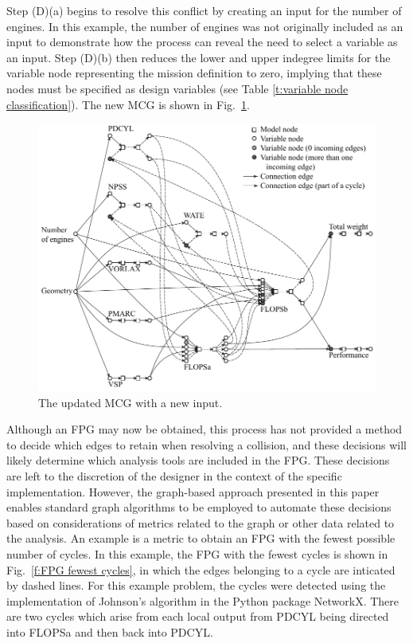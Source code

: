 Step (D)(a) begins to resolve this conflict by creating an input for the number of engines. 
In this example, the number of engines was not originally included as an input to demonstrate how the process can reveal the need to select a variable as an input.
Step (D)(b) then reduces the lower and upper indegree limits for the variable node representing the mission definition to zero, implying that these nodes must be specified as design variables (see Table \ref{t:variable node classification}). 
The new MCG is shown in Fig.~\ref{f:MCG}.
	\begin{figure}[htb!]
	  \begin{center}
		\includegraphics[width=6in]{images/MCG_edit}
	  \end{center}
	  \caption{The updated MCG with a new input.}
	\label{f:MCG}
	\end{figure}

	Although an FPG may now be obtained, this process has not provided a method to decide which edges to retain when resolving a collision, and these decisions will likely determine which analysis tools are included in the FPG. These decisions are left to the discretion of the designer in the context of the specific implementation. 
	However, the graph-based approach presented in this paper enables standard graph algorithms to be employed to automate these decisions based on considerations of metrics related to the graph or other data related to the analysis. 
	An example is a metric to obtain an FPG with the fewest possible number of cycles. 
In this example, the FPG with the fewest cycles is shown in Fig.~\ref{f:FPG fewest cycles}, in which the edges belonging to a cycle are inticated by dashed lines. 
For this example problem, the cycles were detected using the implementation of Johnson's algorithm \cite{Johnson1975} in the Python package NetworkX. 
There are two cycles which arise from each local output from PDCYL being directed into FLOPSa and then back into PDCYL. 

